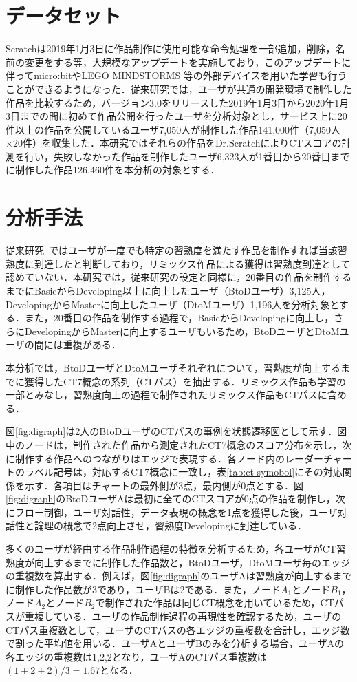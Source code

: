 \documentclass[11pt,dvipdfmx]{jreport}
\begin{document}
\section{データセット}\label{sec:chapter_3-1}
Scratchは2019年1月3日に作品制作に使用可能な命令処理を一部追加，削除，名前の変更をする等，大規模なアップデートを実施しており，このアップデートに伴ってmicro:bitやLEGO MINDSTORMS 等の外部デバイスを用いた学習も行うことができるようになった．従来研究では，ユーザが共通の開発環境で制作した作品を比較するため，バージョン3.0をリリースした2019年1月3日から2020年1月3日までの間に初めて作品公開を行ったユーザを分析対象とし，サービス上に20件以上の作品を公開しているユーザ7,050人が制作した作品141,000件（7,050人×20件）を収集した．本研究ではそれらの作品をDr.ScratchによりCTスコアの計測を行い，失敗しなかった作品を制作したユーザ6,323人が1番目から20番目までに制作した作品126,460件を本分析の対象とする．


\section{分析手法}\label{sec:chapter_3-2}
従来研究~\cite{Ando_2021}ではユーザが一度でも特定の習熟度を満たす作品を制作すれば当該習熟度に到達したと判断しており，リミックス作品による獲得は習熟度到達として認めていない．本研究では，従来研究の設定と同様に，20番目の作品を制作するまでにBasicからDeveloping以上に向上したユーザ（BtoDユーザ）3,125人，DevelopingからMasterに向上したユーザ（DtoMユーザ）1,196人を分析対象とする．また，20番目の作品を制作する過程で，BasicからDevelopingに向上し，さらにDevelopingからMasterに向上するユーザもいるため，BtoDユーザとDtoMユーザの間には重複がある．

本分析では，BtoDユーザとDtoMユーザそれぞれについて，習熟度が向上するまでに獲得したCT7概念の系列（CTパス）を抽出する．リミックス作品も学習の一部とみなし，習熟度向上の過程で制作されたリミックス作品もCTパスに含める．

図\ref{fig:digraph}は2人のBtoDユーザのCTパスの事例を状態遷移図として示す．図中のノードは，制作された作品から測定されたCT7概念のスコア分布を示し，次に制作する作品へのつながりはエッジで表現する．各ノード内のレーダーチャートのラベル記号は，対応するCT7概念に一致し，表\ref{tab:ct-symobol}にその対応関係を示す．各項目はチャートの最外側が3点，最内側が0点とする．図\ref{fig:digraph}のBtoDユーザAは最初に全てのCTスコアが0点の作品を制作し，次にフロー制御，ユーザ対話性，データ表現の概念を1点を獲得した後，ユーザ対話性と論理の概念で2点向上させ，習熟度Developingに到達している．

多くのユーザが経由する作品制作過程の特徴を分析するため，各ユーザがCT習熟度が向上するまでに制作した作品数と，BtoDユーザ，DtoMユーザ毎のエッジの重複数を算出する．例えば，図\ref{fig:digraph}のユーザAは習熟度が向上するまでに制作した作品数が3であり，ユーザBは2である．また，ノード$A_1$とノード$B_1$，ノード$A_2$とノード$B_2$で制作された作品は同じCT概念を用いているため，CTパスが重複している．ユーザの作品制作過程の再現性を確認するため，ユーザのCTパス重複数として，ユーザのCTパスの各エッジの重複数を合計し，エッジ数で割った平均値を用いる．ユーザAとユーザBのみを分析する場合，ユーザAの各エッジの重複数は1,2,2となり，ユーザAのCTパス重複数は$(1 + 2 + 2) / 3 = 1.67$となる．
\end{document}
